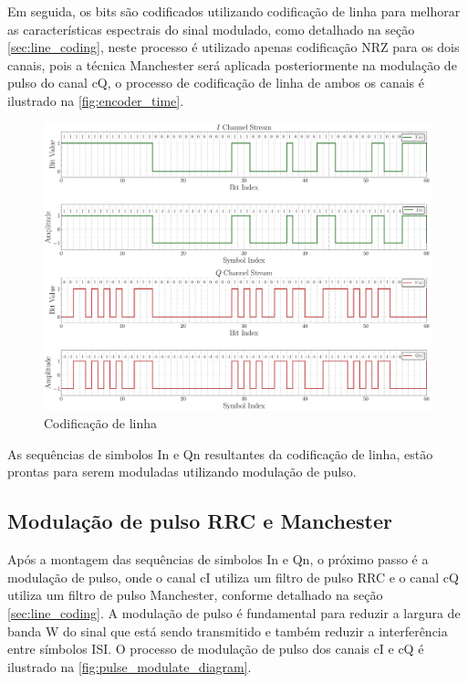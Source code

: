 Em seguida, os bits são codificados utilizando codificação de linha para melhorar as características espectrais do sinal modulado, como detalhado na seção \ref{sec:line_coding}, neste processo é utilizado apenas codificação \gls{NRZ} para os dois canais, pois a técnica \gls{Manchester} será aplicada posteriormente na modulação de pulso do canal \gls{cQ}, o processo de codificação de linha de ambos os canais é ilustrado na \autoref{fig:encoder_time}.

\begin{figure}[H]
	\centering
	\caption{Codificação de linha}\label{fig:encoder_time}
	\includegraphics[width=\linewidth]{assets/cap3/transmitter_encoder_time.pdf}
\end{figure}

As sequências de simbolos \gls{In} e \gls{Qn} resultantes da codificação de linha, estão prontas para serem moduladas utilizando modulação de pulso. 

\subsection{Modulação de pulso RRC e Manchester}

Após a montagem das sequências de simbolos \gls{In} e \gls{Qn}, o próximo passo é a modulação de pulso, onde o canal \gls{cI} utiliza um filtro de pulso \gls{RRC} e o canal \gls{cQ} utiliza um filtro de pulso \gls{Manchester}, conforme detalhado na seção \ref{sec:line_coding}. A modulação de pulso é fundamental para reduzir a largura de banda \gls{W} do sinal que está sendo transmitido e também reduzir a interferência entre símbolos \gls{ISI}. O processo de modulação de pulso dos canais \gls{cI} e \gls{cQ} é ilustrado na \autoref{fig:pulse_modulate_diagram}.


